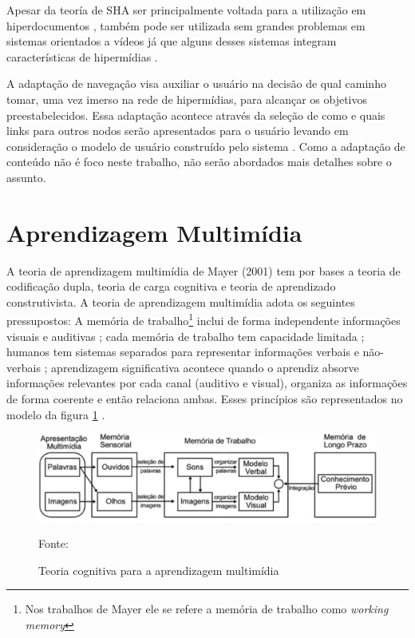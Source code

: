 Apesar da teoría de SHA ser principalmente voltada para a utilização em hiperdocumentos \cite{brusilovsky1998}, também pode ser utilizada sem grandes problemas em sistemas orientados a vídeos já que alguns desses sistemas integram características de hipermídias \cite{aubert2005}.

A adaptação de navegação visa auxiliar o usuário na decisão de qual caminho tomar, uma vez imerso na rede de hipermídias, para alcançar os objetivos preestabelecidos. Essa adaptação acontece através da seleção de como e quais links para outros nodos serão apresentados para o usuário levando em consideração o modelo de usuário construído pelo sistema \cite{brusilovsky1996}. Como a adaptação de conteúdo não é foco neste trabalho, não serão abordados mais detalhes sobre o assunto.

\section{Aprendizagem Multimídia}

A teoria de aprendizagem multimídia de Mayer (2001) tem por bases a teoria de codificação dupla, teoria de carga cognitiva e teoria de aprendizado construtivista. A teoria de aprendizagem multimídia adota os seguintes pressupostos: A memória de trabalho\footnote{Nos trabalhos de Mayer ele se refere a memória de trabalho como \textit{working memory}} inclui de forma independente informações visuais e auditivas \cite{baddeley1986}; cada memória de trabalho tem capacidade limitada \cite{chandler1992}; humanos tem sistemas separados para representar  informações verbais e não-verbais \cite{paivio1986}; aprendizagem significativa acontece quando o aprendiz absorve informações relevantes por cada canal (auditivo e visual), organiza as informações de forma coerente e então relaciona ambas. Esses princípios são representados no modelo da figura \ref{fig:aprendizado} \cite{moreno2000}.

\begin{figure}[h!]
	\centering
  	\includegraphics[width=.9\linewidth]{figuras/aprendizado.eps}
  	\caption{Teoria cognitiva para a aprendizagem multimídia}
  	\small{Fonte: \cite{mayer2001}}
  	\label{fig:aprendizado}
\end{figure}

